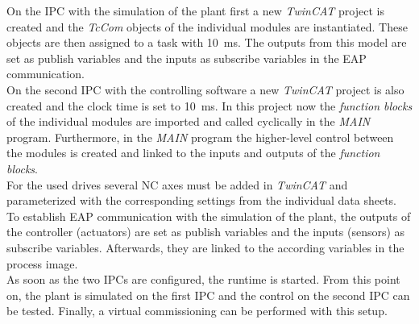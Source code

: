     On the IPC with the simulation of the plant first a new \textit{TwinCAT} project is created and the \textit{TcCom} objects of the individual modules are instantiated. These objects are then assigned to a task with \SI{10}{\milli\second}. The outputs from this model are set as publish variables and the inputs as subscribe variables in the EAP communication. \\
    On the second IPC with the controlling software a new \textit{TwinCAT} project is also created and the clock time is set to \SI{10}{\milli\second}. In this project now the \textit{function blocks} of the individual modules are imported and called cyclically in the \textit{MAIN} program. Furthermore, in the \textit{MAIN} program the higher-level control between the modules is created and linked to the inputs and outputs of the \textit{function blocks}. \\
    For the used drives several NC axes must be added in \textit{TwinCAT} and parameterized with the corresponding settings from the individual data sheets. \\
    To establish EAP communication with the simulation of the plant, the outputs of the controller (actuators) are set as publish variables and the inputs (sensors) as subscribe variables. Afterwards, they are linked to the according variables in the process image. \\
    
    As soon as the two IPCs are configured, the runtime is started. From this point on, the plant is simulated on the first IPC and the control on the second IPC can be tested. Finally, a virtual commissioning can be performed with this setup.
    
